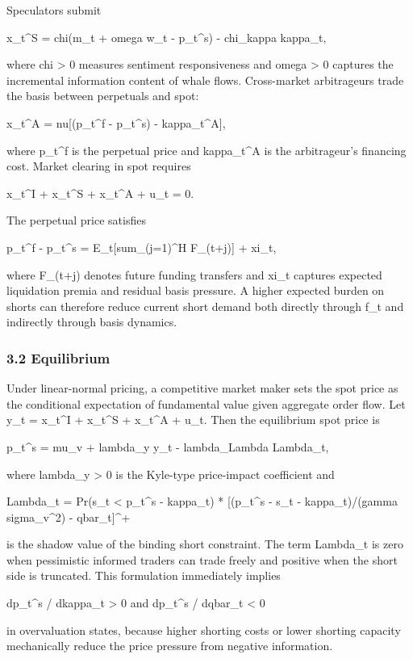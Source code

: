 \documentclass[
]{article}
\begin{document}
Speculators submit

x\_t\^{}S = chi(m\_t + omega w\_t - p\_t\^{}s) - chi\_kappa kappa\_t,

where chi \textgreater{} 0 measures sentiment responsiveness and omega
\textgreater{} 0 captures the incremental information content of whale
flows. Cross-market arbitrageurs trade the basis between perpetuals and
spot:

x\_t\^{}A = nu{[}(p\_t\^{}f - p\_t\^{}s) - kappa\_t\^{}A{]},

where p\_t\^{}f is the perpetual price and kappa\_t\^{}A is the
arbitrageur's financing cost. Market clearing in spot requires

x\_t\^{}I + x\_t\^{}S + x\_t\^{}A + u\_t = 0.

The perpetual price satisfies

p\_t\^{}f - p\_t\^{}s = E\_t{[}sum\_(j=1)\^{}H F\_(t+j){]} + xi\_t,

where F\_(t+j) denotes future funding transfers and xi\_t captures
expected liquidation premia and residual basis pressure. A higher
expected burden on shorts can therefore reduce current short demand both
directly through f\_t and indirectly through basis dynamics.

\subsubsection{3.2 Equilibrium}\label{32-equilibrium}

Under linear-normal pricing, a competitive market maker sets the spot
price as the conditional expectation of fundamental value given
aggregate order flow. Let y\_t = x\_t\^{}I + x\_t\^{}S + x\_t\^{}A +
u\_t. Then the equilibrium spot price is

p\_t\^{}s = mu\_v + lambda\_y y\_t - lambda\_Lambda Lambda\_t,

where lambda\_y \textgreater{} 0 is the Kyle-type price-impact
coefficient and

Lambda\_t = Pr(s\_t \textless{} p\_t\^{}s - kappa\_t) * {[}(p\_t\^{}s -
s\_t - kappa\_t)/(gamma sigma\_v\^{}2) - qbar\_t{]}\^{}+

is the shadow value of the binding short constraint. The term Lambda\_t
is zero when pessimistic informed traders can trade freely and positive
when the short side is truncated. This formulation immediately implies

dp\_t\^{}s / dkappa\_t \textgreater{} 0 and dp\_t\^{}s / dqbar\_t
\textless{} 0

in overvaluation states, because higher shorting costs or lower shorting
capacity mechanically reduce the price pressure from negative
information.
\end{document}
